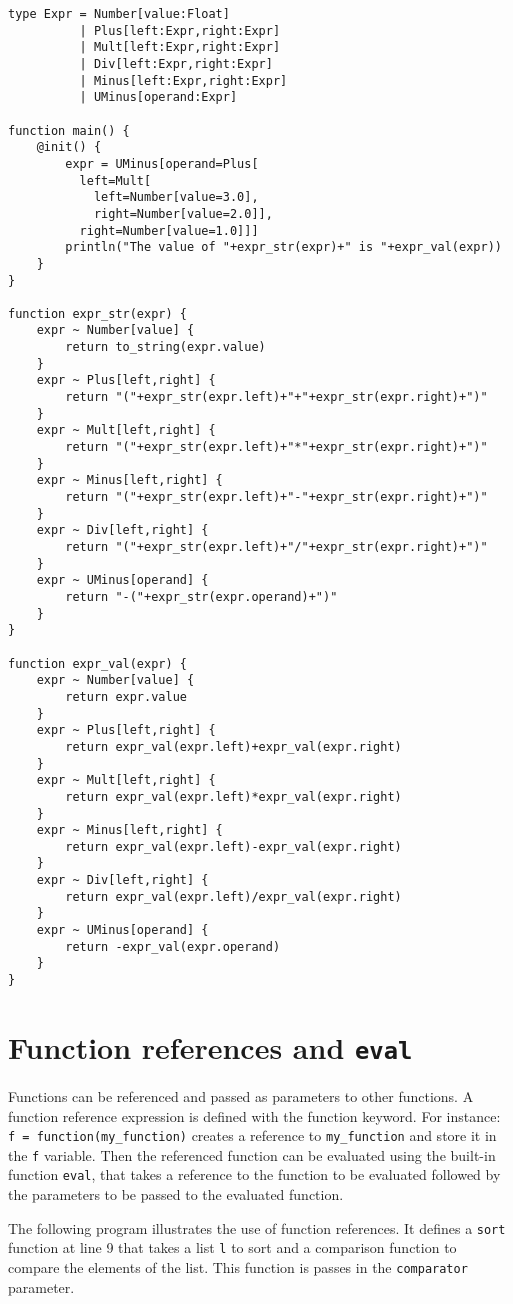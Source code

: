 \documentclass[11pt]{report}
\begin{document}
{ \footnotesize
\begin{lstlisting}
type Expr = Number[value:Float]
          | Plus[left:Expr,right:Expr]
          | Mult[left:Expr,right:Expr]
          | Div[left:Expr,right:Expr]
          | Minus[left:Expr,right:Expr]
          | UMinus[operand:Expr]

function main() {
	@init() {
		expr = UMinus[operand=Plus[
		  left=Mult[
		    left=Number[value=3.0],
		    right=Number[value=2.0]],
	      right=Number[value=1.0]]]
		println("The value of "+expr_str(expr)+" is "+expr_val(expr))
	}
}

function expr_str(expr) {
	expr ~ Number[value] {
		return to_string(expr.value)
	}
	expr ~ Plus[left,right] {
		return "("+expr_str(expr.left)+"+"+expr_str(expr.right)+")"
	}
	expr ~ Mult[left,right] {
		return "("+expr_str(expr.left)+"*"+expr_str(expr.right)+")"
	}
	expr ~ Minus[left,right] {
		return "("+expr_str(expr.left)+"-"+expr_str(expr.right)+")"
	}
	expr ~ Div[left,right] {
		return "("+expr_str(expr.left)+"/"+expr_str(expr.right)+")"
	}
	expr ~ UMinus[operand] {
		return "-("+expr_str(expr.operand)+")"
	}
}

function expr_val(expr) {
	expr ~ Number[value] {
		return expr.value
	}
	expr ~ Plus[left,right] {
		return expr_val(expr.left)+expr_val(expr.right)
	}
	expr ~ Mult[left,right] {
		return expr_val(expr.left)*expr_val(expr.right)
	}
	expr ~ Minus[left,right] {
		return expr_val(expr.left)-expr_val(expr.right)
	}
	expr ~ Div[left,right] {
		return expr_val(expr.left)/expr_val(expr.right)
	}
	expr ~ UMinus[operand] {
		return -expr_val(expr.operand)
	}
}
\end{lstlisting} }

\section{Function references and \texttt{eval}}

Functions can be referenced and passed as parameters to other functions. A function reference expression is defined with the function keyword. For instance: \texttt{f = function(my\_function)} creates a reference to \texttt{my\_function} and store it in the \texttt{f} variable. Then the referenced function can be evaluated using the built-in function \texttt{eval}, that takes  a reference to the function to be evaluated followed by the parameters to be passed to the evaluated function.

The following program illustrates the use of function references. It defines a \texttt{sort} function at line 9 that takes a list \texttt{l} to sort and a comparison function to compare the elements of the list. This function is passes in the \texttt{comparator} parameter.
\end{document}
